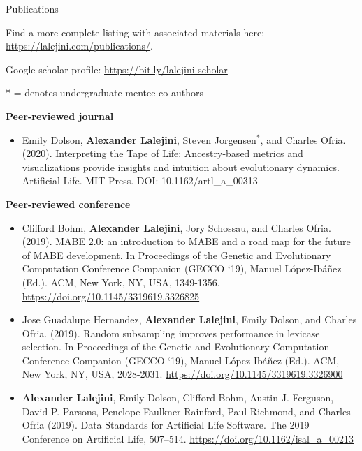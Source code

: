 \begin{rSection}{Publications}

Find a more complete listing with associated materials here: \url{https://lalejini.com/publications/}.

Google scholar profile: \url{https://bit.ly/lalejini-scholar}

* = denotes undergraduate mentee co-authors

\underline{\large {\bf Peer-reviewed journal}}

\begin{itemize}
  \item Emily Dolson, \textbf{Alexander Lalejini}, Steven Jorgensen$^{*}$, and Charles Ofria. (2020).
  Interpreting the Tape of Life: Ancestry-based metrics and visualizations provide insights and intuition about evolutionary dynamics.
  Artificial Life. MIT Press. DOI: 10.1162/artl\_a\_00313
\end{itemize}

\underline{\large {\bf Peer-reviewed conference}}

\begin{itemize}

\item Clifford Bohm, \textbf{Alexander Lalejini}, Jory Schossau, and Charles Ofria. (2019).
MABE 2.0: an introduction to MABE and a road map for the future of MABE development.
In Proceedings of the Genetic and Evolutionary Computation Conference Companion (GECCO ‘19), Manuel López-Ibáñez (Ed.). ACM, New York, NY, USA, 1349-1356.
\url{https://doi.org/10.1145/3319619.3326825}

\item Jose Guadalupe Hernandez, \textbf{Alexander Lalejini}, Emily Dolson, and Charles Ofria. (2019).
Random subsampling improves performance in lexicase selection.
In Proceedings of the Genetic and Evolutionary Computation Conference Companion (GECCO ‘19), Manuel López-Ibáñez (Ed.). ACM, New York, NY, USA, 2028-2031.
\url{https://doi.org/10.1145/3319619.3326900}

\item \textbf{Alexander Lalejini}, Emily Dolson, Clifford Bohm, Austin J. Ferguson, David P. Parsons, Penelope Faulkner Rainford, Paul Richmond, and Charles Ofria (2019).
Data Standards for Artificial Life Software.
The 2019 Conference on Artificial Life, 507–514.
\url{https://doi.org/10.1162/isal_a_00213}


\end{itemize}
\end{rSection}
